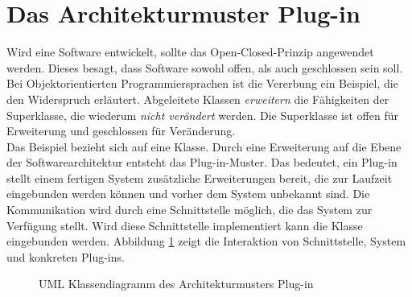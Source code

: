 \section{Das Architekturmuster Plug-in}

Wird eine Software entwickelt, sollte das Open-Closed-Prinzip angewendet werden. Dieses besagt, dass Software sowohl offen, als auch geschlossen sein soll\cite[1.8]{goll:swa}. Bei Objektorientierten Programmiersprachen ist die Vererbung ein Beispiel, die den Widerspruch erläutert. Abgeleitete Klassen \textit{erweitern} die Fähigkeiten der Superklasse, die wiederum \textit{nicht verändert} werden. Die Superklasse ist offen für Erweiterung und geschlossen für Veränderung.\\
Das Beispiel bezieht sich auf eine Klasse. Durch eine Erweiterung auf die Ebene der Softwarearchitektur entsteht das Plug-in-Muster. Das bedeutet, ein Plug-in stellt einem fertigen System zusätzliche Erweiterungen bereit, die zur Laufzeit eingebunden werden können und vorher dem System unbekannt sind. Die Kommunikation wird durch eine Schnittstelle möglich, die das System zur Verfügung stellt. Wird diese Schnittstelle implementiert kann die Klasse eingebunden werden. Abbildung \ref{pluginpattern} zeigt die Interaktion von Schnittstelle, System und konkreten Plug-ins.

\begin{figure}[htbp]
  \vspace{0.5cm}
  \centering
   \caption{UML Klassendiagramm des Architekturmusters Plug-in}
  \label{pluginpattern}
  \vspace{0.5cm}
\end{figure}